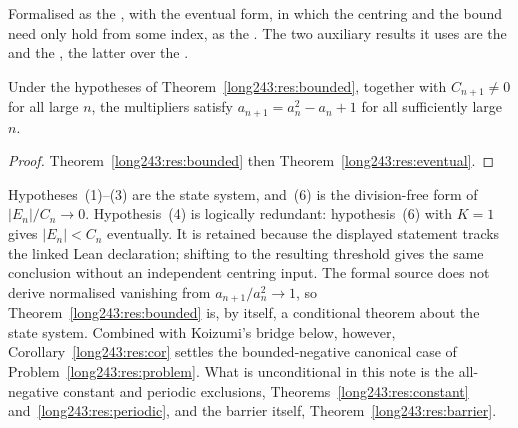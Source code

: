 \documentclass[11pt]{article}
\begin{document}
\noindent Formalised as the
, with the eventual form, in which the centring and the bound need
only hold from some index, as the
.  The two auxiliary results it uses are the
 and the
, the latter over the
.

\begin{corollary}\label{long243:res:cor}
Under the hypotheses of Theorem~\ref{long243:res:bounded}, together with
$C_{n+1}\ne0$ for all large $n$, the multipliers satisfy
$a_{n+1}=a_n^{2}-a_n+1$ for all sufficiently large $n$.
\end{corollary}

\begin{proof}
Theorem~\ref{long243:res:bounded} then Theorem~\ref{long243:res:eventual}.
\end{proof}

Hypotheses~(1)--(3) are the state system, and~(6) is the division-free form of
$|E_n|/C_n\to0$.  Hypothesis~(4) is logically redundant: hypothesis~(6) with
$K=1$ gives $|E_n|<C_n$ eventually.  It is retained because the displayed
statement tracks the linked Lean declaration; shifting to the resulting
threshold gives the same conclusion without an independent centring input.
The formal source does not derive normalised vanishing from
$a_{n+1}/a_n^{2}\to1$, so Theorem~\ref{long243:res:bounded} is, by itself, a
conditional theorem about the state system.  Combined with
Koizumi's bridge below, however, Corollary~\ref{long243:res:cor} settles the
bounded-negative canonical case of Problem~\ref{long243:res:problem}.  What is
unconditional in this note is the all-negative constant and periodic
exclusions, Theorems~\ref{long243:res:constant} and~\ref{long243:res:periodic}, and the barrier
itself, Theorem~\ref{long243:res:barrier}.
\end{document}
